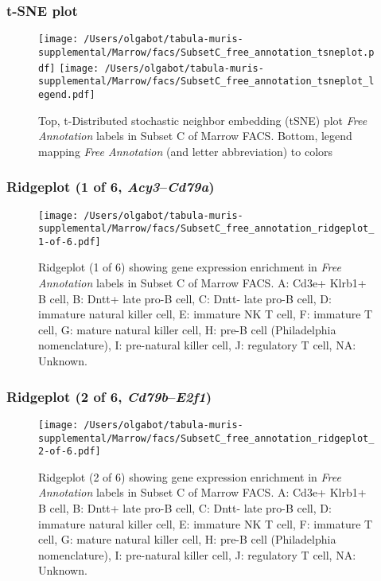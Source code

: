 \clearpage
\subsubsection{t-SNE plot}
\begin{figure}[h]
\centering
\texttt{[image: /Users/olgabot/tabula-muris-supplemental/Marrow/facs/SubsetC\_free\_annotation\_tsneplot.pdf]}
\texttt{[image: /Users/olgabot/tabula-muris-supplemental/Marrow/facs/SubsetC\_free\_annotation\_tsneplot\_legend.pdf]}
\caption{Top, t-Distributed stochastic neighbor embedding (tSNE) plot  \emph{Free Annotation} labels in Subset C of Marrow FACS. Bottom, legend mapping \emph{Free Annotation} (and letter abbreviation) to colors}
\end{figure}


\clearpage

\subsubsection{Ridgeplot (1 of 6, \emph{Acy3}--\emph{Cd79a})}
\begin{figure}[h]
\centering
\texttt{[image: /Users/olgabot/tabula-muris-supplemental/Marrow/facs/SubsetC\_free\_annotation\_ridgeplot\_1-of-6.pdf]}

\caption{ Ridgeplot (1 of 6)  showing gene expression enrichment in \emph{Free Annotation} labels in Subset C of Marrow FACS. A: Cd3e+ Klrb1+ B cell, B: Dntt+ late pro-B cell, C: Dntt- late pro-B cell, D: immature natural killer cell, E: immature NK T cell, F: immature T cell, G: mature natural killer cell, H: pre-B cell (Philadelphia nomenclature), I: pre-natural killer cell, J: regulatory T cell, NA: Unknown.}
\end{figure}


\clearpage

\subsubsection{Ridgeplot (2 of 6, \emph{Cd79b}--\emph{E2f1})}
\begin{figure}[h]
\centering
\texttt{[image: /Users/olgabot/tabula-muris-supplemental/Marrow/facs/SubsetC\_free\_annotation\_ridgeplot\_2-of-6.pdf]}

\caption{ Ridgeplot (2 of 6)  showing gene expression enrichment in \emph{Free Annotation} labels in Subset C of Marrow FACS. A: Cd3e+ Klrb1+ B cell, B: Dntt+ late pro-B cell, C: Dntt- late pro-B cell, D: immature natural killer cell, E: immature NK T cell, F: immature T cell, G: mature natural killer cell, H: pre-B cell (Philadelphia nomenclature), I: pre-natural killer cell, J: regulatory T cell, NA: Unknown.}
\end{figure}



